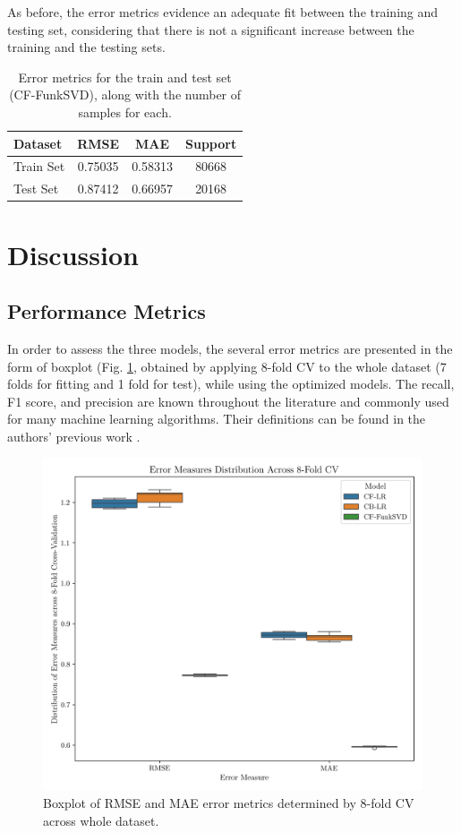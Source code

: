 \documentclass[conference]{IEEEtran}
\begin{document}
As before, the error metrics evidence an adequate fit between the training and testing set, considering that there is not a significant increase between the training and the testing sets.
\newline
\newline
\begin{table}[H]
\centering
\caption{Error metrics for the train and test set (CF-FunkSVD), along with the number of samples for each.}
\label{tab:model03_results}
\begin{tabular}{lccc}
\toprule
\textbf{Dataset} & \textbf{RMSE} & \textbf{MAE} & \textbf{Support} \\
\midrule
Train Set & 0.75035 & 0.58313 & 80668 \\
Test Set & 0.87412 & 0.66957 & 20168 \\
\bottomrule
\end{tabular}
\end{table}


\section{Discussion} 
\subsection{Performance Metrics} %

In order to assess the three models, the several error metrics are presented in the form of boxplot (Fig. \ref{fig:results_boxplot}, obtained by applying 8-fold CV to the whole dataset (7 folds for fitting and 1 fold for test), while using the optimized models. The recall, F1 score, and precision are known throughout the literature and commonly used for many machine learning algorithms. Their definitions can be found in the authors' previous work \cite{jpveris}.

\begin{figure}[H]
    \centering
    \includegraphics[width=1\linewidth]{assets/results_boxplot.png}
    \caption{Boxplot of RMSE and MAE error metrics determined by 8-fold CV across whole dataset.}
    \label{fig:results_boxplot}
\end{figure}
\end{document}
